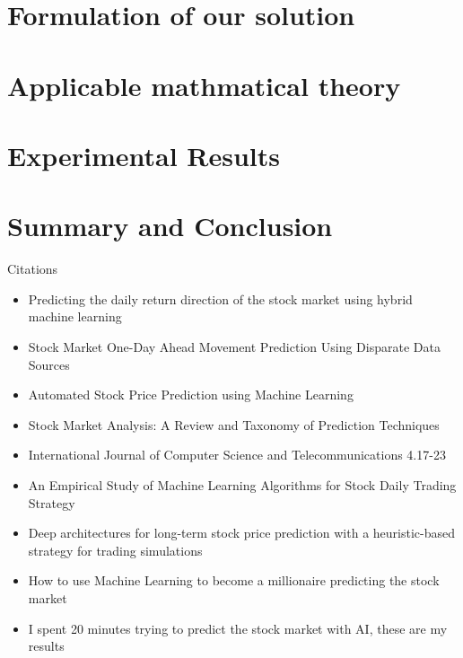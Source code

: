 \documentclass[conference]{IEEEtran}
\begin{document}
\section{Formulation of our solution}

\section{Applicable mathmatical theory}

\section{Experimental Results}

\section{Summary and Conclusion}


Citations
\begin{itemize}
\item Predicting the daily return direction of the stock market using hybrid machine learning\cite{DailyReturnDirection}
\item Stock Market One-Day Ahead Movement Prediction Using Disparate Data Sources\cite {Onedayahead}
\item Automated Stock Price Prediction using Machine Learning \cite{AutomatedPrediction}
\item Stock Market Analysis: A Review and Taxonomy of Prediction Techniques \cite{TaxonomyofPrediction}
\item International Journal of Computer Science and Telecommunications 4.17-23 \cite {MLModelPrediction}
\item An Empirical Study of Machine Learning Algorithms for Stock Daily Trading Strategy \cite{EmpiricalStudy}
\item Deep architectures for long-term stock price prediction with a heuristic-based strategy for trading simulations \cite{LongTermPricePrediction}
\item How to use Machine Learning to become a millionaire predicting the stock market \cite{WebBecomeMillionaire}
\item I spent 20 minutes trying to predict the stock market with AI, these are my results \cite{20MinStockPredict}
\end{itemize}





\vspace{12pt}
\end{document}
